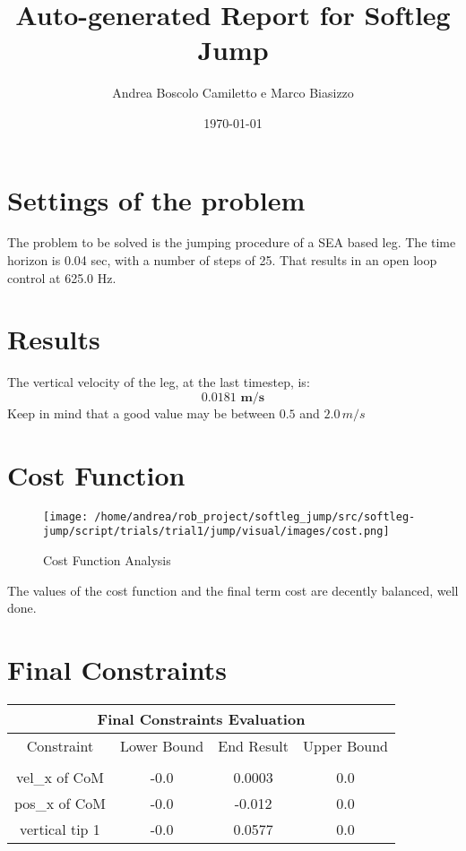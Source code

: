 \documentclass{article}%
\title{Auto{-}generated Report for Softleg Jump}%
\author{Andrea Boscolo Camiletto e Marco Biasizzo}%
\date{\today}%
\begin{document}
%
\normalsize%
\maketitle%
\section{Settings of the problem}%
\label{sec:Settingsoftheproblem}%
The problem to be solved is the jumping procedure of a SEA based leg.%
The time horizon is 0.04 sec, with a number of steps of 25. That results in an open loop control at 625.0 Hz.

%
\section{Results}%
\label{sec:Results}%
The vertical velocity of the leg, at the last timestep, is:%
\[%
\boldsymbol{0.0181\,\, m/s}%
\]%
Keep in mind that a good value may be between $0.5$ and $2.0 \, m/s$

%
\section{Cost Function}%
\label{sec:CostFunction}%


\begin{figure}[h!]%
\centering%
\texttt{[image: /home/andrea/rob\_project/softleg\_jump/src/softleg-jump/script/trials/trial1/jump/visual/images/cost.png]}%
\caption{Cost Function Analysis}%
\end{figure}

%
%
The values of the cost function and the final term cost are decently balanced, well done.

%
\pagebreak%
\section{Final Constraints}%
\label{sec:FinalConstraints}%
\begin{center}%
\begin{tabular}{c|c|c|c}%
\hline%
\multicolumn{4}{|c|}{Final Constraints Evaluation}\\%
\hline%
Constraint&Lower Bound&End Result&Upper Bound\\%
\hline%
&&&\\%
\multirow{1}{*}{vel\_x of CoM}&{-}0.0&0.0003&0.0\\%
\hline%
\multirow{1}{*}{pos\_x of CoM}&{-}0.0&{-}0.012&0.0\\%
\hline%
\multirow{1}{*}{vertical tip 1}&{-}0.0&0.0577&0.0\\%
\hline%
\end{tabular}%
\end{center}
\end{document}
